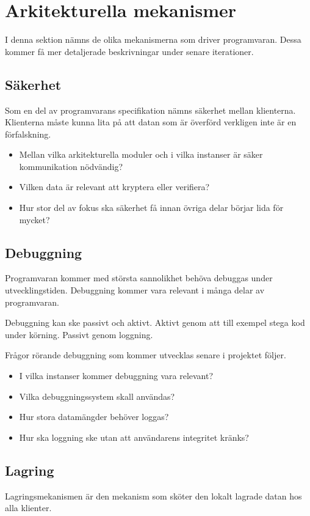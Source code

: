 \section{Arkitekturella mekanismer}
I denna sektion nämns de olika mekanismerna som driver programvaran. Dessa kommer få mer detaljerade beskrivningar under senare iterationer.
\subsection{Säkerhet}
Som en del av programvarans specifikation nämns säkerhet mellan klienterna. Klienterna måste kunna lita på att datan som är överförd verkligen inte är en förfalskning.

\begin{itemize}
\item Mellan vilka arkitekturella moduler och i vilka instanser är säker kommunikation nödvändig?
\item Vilken data är relevant att kryptera eller verifiera?
\item Hur stor del av fokus ska säkerhet få innan övriga delar börjar lida för mycket?
\end{itemize}
\subsection{Debuggning}
Programvaran kommer med största sannolikhet behöva debuggas under utvecklingstiden. Debuggning kommer vara relevant i många delar av programvaran.

Debuggning kan ske passivt och aktivt. Aktivt genom att till exempel stega kod under körning. Passivt genom loggning.

Frågor rörande debuggning som kommer utvecklas senare i projektet följer.
\begin{itemize}
\item I vilka instanser kommer debuggning vara relevant?
\item Vilka debuggningssystem skall användas?
\item Hur stora datamängder behöver loggas?
\item Hur ska loggning ske utan att användarens integritet kränks?
\end{itemize}
\subsection{Lagring}
Lagringsmekanismen är den mekanism som sköter den lokalt lagrade datan hos alla klienter.

